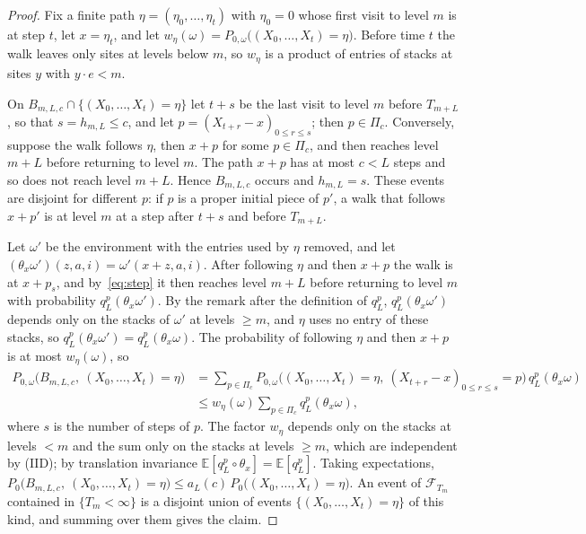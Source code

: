 \documentclass[11pt]{amsart}
\theoremstyle{remark}
\newcommand{\E}{\mathbb{E}}
\begin{document}
\begin{proof}
Fix a finite path $\eta=(\eta_0,\dots,\eta_t)$ with $\eta_0=0$ whose first visit to level $m$ is at step $t$, let
$x=\eta_t$, and let $w_\eta(\omega)=P_{0,\omega}\bigl((X_0,\dots,X_t)=\eta\bigr)$. Before time $t$ the walk leaves only
sites at levels below $m$, so $w_\eta$ is a product of entries of stacks at sites $y$ with $y\cdot e<m$.

On $B_{m,L,c}\cap\{(X_0,\dots,X_t)=\eta\}$ let $t+s$ be the last visit to level $m$ before $T_{m+L}$, so that
$s=h_{m,L}\le c$, and let $p=(X_{t+r}-x)_{0\le r\le s}$; then $p\in\Pi_c$. Conversely, suppose the walk follows $\eta$, then
$x+p$ for some $p\in\Pi_c$, and then reaches level $m+L$ before returning to level $m$. The path $x+p$ has at most
$c<L$ steps and so does not reach level $m+L$. Hence $B_{m,L,c}$ occurs and $h_{m,L}=s$. These events are disjoint
for different $p$: if $p$ is a proper initial piece of $p'$, a walk that follows $x+p'$ is at level $m$ at a step
after $t+s$ and before $T_{m+L}$.

Let $\omega'$ be the environment with the entries used by $\eta$ removed, and let
$(\theta_x\omega')(z,a,i)=\omega'(x+z,a,i)$. After following $\eta$ and then $x+p$ the walk is at $x+p_s$, and
by~\eqref{eq:step} it then reaches level $m+L$ before returning to level $m$ with probability
$q_L^p(\theta_x\omega')$. By the remark after the definition of $q_L^p$, $q_L^p(\theta_x\omega')$ depends only on the stacks of $\omega'$ at
levels $\ge m$, and $\eta$ uses no entry of these stacks, so $q_L^p(\theta_x\omega')=q_L^p(\theta_x\omega)$. The probability of following $\eta$
and then $x+p$ is at most $w_\eta(\omega)$, so
\begin{align*}
P_{0,\omega}\bigl(B_{m,L,c},\ (X_0,\dots,X_t)=\eta\bigr)
&=\sum_{p\in\Pi_c}P_{0,\omega}\bigl((X_0,\dots,X_t)=\eta,\ (X_{t+r}-x)_{0\le r\le s}=p\bigr)\,q_L^p(\theta_x\omega)\\
&\le w_\eta(\omega)\sum_{p\in\Pi_c}q_L^p(\theta_x\omega),
\end{align*}
where $s$ is the number of steps of $p$.
The factor $w_\eta$ depends only on the stacks at levels $<m$ and the sum only on the stacks at levels $\ge m$, which
are independent by (IID); by translation invariance $\E[q_L^p\circ\theta_x]=\E[q_L^p]$. Taking expectations,
$P_0\bigl(B_{m,L,c},\ (X_0,\dots,X_t)=\eta\bigr)\le a_L(c)\,P_0\bigl((X_0,\dots,X_t)=\eta\bigr)$. An event of
$\mathcal F_{T_m}$ contained in $\{T_m<\infty\}$ is a disjoint union of events $\{(X_0,\dots,X_t)=\eta\}$ of this
kind, and summing over them gives the claim.
\end{proof}
\end{document}
